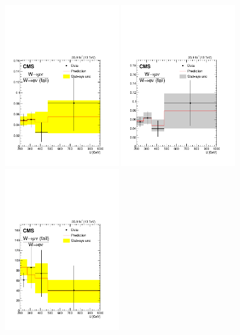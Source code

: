 \begin{figure}
\centering
\includegraphics[width=0.45\textwidth]{figures/pullsImpact/ratio_wmn_wen_fail_shapes_prefit.pdf}
\includegraphics[width=0.45\textwidth]{figures/pullsImpact/ratio_wmn_wen_fail_shapes_fit_b.pdf}\\
\includegraphics[width=0.45\textwidth]{figures/pullsImpact/ratio_wmn_fail_wen_shapes_prefit.pdf}

\end{figure}
